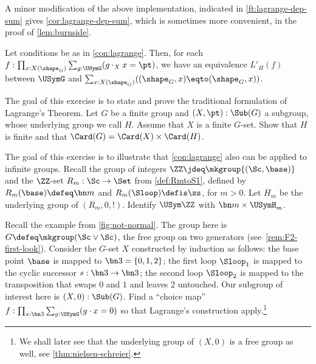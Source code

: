 A minor modification of the above implementation,
indicated in \cref{ft:lagrange-dep-sum} gives \cref{cor:lagrange-dep-sum}, 
which is sometimes more convenient, \eg in the proof of \cref{lem:burnside}.

\begin{construction}\label{cor:lagrange-dep-sum}
  Let conditions be as in \cref{con:lagrange}. Then, for each
  $f : \prod_{x:X(\sh_G)}\sum_{g:\USymG} (g\cdot_X x = \pt)$, we have an
  equivalence $L'_H(f)$ between $\USymG$ and
  $\sum_{x:X(\sh_G)}((\sh_G,x)\eqto(\sh_G,x))$.
\end{construction}

\begin{xca}\label{xca:lagrange}
The goal of this exercise is to state and prove the traditional
formulation of  Lagrange's Theorem. 
Let $G$ be a finite group and $(X,\pt):\Sub(G)$ a subgroup,
whose underlying group we call $H$. 
Assume that $X$ is a finite $G$-set. Show that $H$ is finite and
that $\Card(G) = \Card(X) \times \Card(H)$.
\end{xca}

\begin{xca}\label{xca:lagrange-Z-action-Rm}
The goal of this exercise is to illustrate that \cref{con:lagrange}
also can be applied to infinite groups. 
Recall the group of integers $\ZZ\jdeq\mkgroup{(\Sc,\base)}$ and the $\ZZ$-set
$R_m: \Sc\to\Set$ from \cref{def:RmtoS1}, defined by $R_m(\base) \defeq \bn m$
and $R_m(\Sloop) \defis \zs$, for $m>0$. Let $H_m$ be the underlying group
of $(R_m,0,!)$. Identify $\USym\ZZ$ with $\bn m \times \USymH_m$.
\end{xca}

\begin{xca}\label{xca:lagrange-if-subgr-not-normal}
  Recall the example from \cref{fig:not-normal}. The group here is
  $G\defeq \mkgroup (\Sc \vee \Sc)$, the free group on two generators
  (see~\ref{rem:F2-first-look}). Consider the $G$-set $X$ constructed by
  induction as follows: the base point $\base$ is mapped to $\bn 3 = \{0,1,2\}$;
  the first loop $\Sloop_1$ is mapped to the cyclic successor
  $s: \bn 3 \to \bn 3$; the second loop $\Sloop_2$ is mapped to the
  transposition that swaps $0$ and $1$ and leaves $2$ untouched. Our subgroup of
  interest here is $(X,0):\Sub(G)$. Find a ``choice map''
  $f:\prod_{x:\bn 3}\sum_{g:\USymG} (g\cdot x = 0)$ so that Lagrange's
  construction apply.\footnote{We shall later see that the underlying group of
    $(X,0)$ is a free group as well, see \cref{thm:nielsen-schreier}.}
\end{xca}


